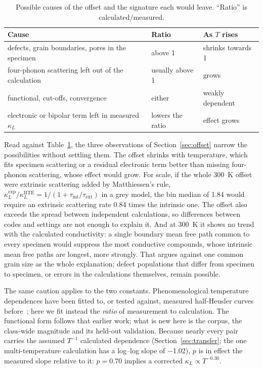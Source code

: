 \begin{table}[!b]
  \centering
  \caption{Possible causes of the offset and the signature each would leave. ``Ratio'' is
  calculated/measured.}
  \label{tab:causes}
  \footnotesize
  \setlength{\tabcolsep}{3pt}
  \begin{tabular}{>{\raggedright\arraybackslash}p{}>{\raggedright\arraybackslash}p{}>{\raggedright\arraybackslash}p{}}
    \toprule
    Cause & Ratio & As $T$ rises \\
    \midrule
    defects, grain boundaries, pores in the specimen & above 1 & shrinks towards 1 \\
    four-phonon scattering left out of the calculation & usually above 1 & grows \\
    functional, cut-offs, convergence & either & weakly dependent \\
    electronic or bipolar term left in measured $\kappa_L$ & lowers the ratio & effect grows \\
    \bottomrule
  \end{tabular}
\end{table}

Read against Table~\ref{tab:causes}, the three observations of Section~\ref{sec:offset} narrow the
possibilities without settling them. The offset shrinks with temperature, which fits specimen
scattering or a residual electronic term better than missing four-phonon scattering, whose effect
would grow. For scale, if the whole \SI{300}{\kelvin} offset were extrinsic scattering added by
Matthiessen's rule,
$\kappa_L^{\mathrm{exp}}/\kappa_L^{\mathrm{BTE}} = 1/(1+\tau_{\mathrm{int}}/\tau_{\mathrm{ext}})$ in a
grey model, the bin median of \num{1.84} would require an extrinsic scattering rate \num{0.84} times
the intrinsic one. The offset also exceeds the spread between independent calculations, so
differences between codes and settings are not enough to explain it. And at \SI{300}{\kelvin} it
shows no trend with the calculated conductivity: a single boundary mean free path common to every
specimen would suppress the most conductive compounds, whose intrinsic mean free paths are
longest, more strongly. That argues against one common grain size as the whole explanation; defect
populations that differ from specimen to specimen, or errors in the calculations themselves,
remain possible.

The same caution applies to the two constants. Phenomenological temperature dependences
have been fitted to, or tested against, measured half-Heusler curves
before~\cite{geng2014lattice,petersen2015critical}; here we fit instead the \emph{ratio} of
measurement to calculation. The functional form follows that earlier work; what is new here is the
corpus, the class-wide magnitude and its held-out validation. Because nearly every pair carries
the assumed $T^{-1}$ calculated dependence (Section~\ref{sec:transfer}; the one multi-temperature
calculation has a log--log slope of \num{-1.02}), $p$ is in effect the measured slope relative to
it: $p=\num{0.70}$ implies a corrected $\kappa_L \propto T^{-0.30}$.

